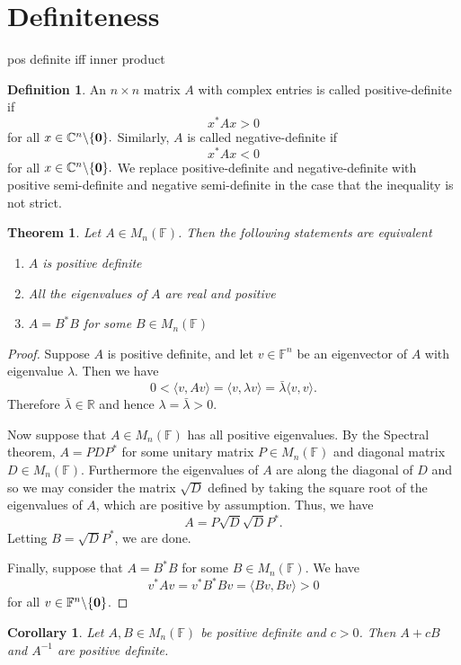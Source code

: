 \documentclass[oneside, 12pt]{book}
\newtheorem{thm}{Theorem}[section]
\newtheorem{cor}{Corollary}[section]
\theoremstyle{definition}
\newtheorem{defn}{Definition}[section]
\begin{document}
\section{Definiteness}
pos definite iff inner product
\begin{defn}
  \label{defn_posdef}
  An $n \times n$ matrix $A$ with complex entries is called positive-definite if \[x^{*}Ax>0\] for all $x \in \mathbb{C}^{n}\backslash\{\bold{0} \}.$
  Similarly, $A$ is called negative-definite if \[x^{*}Ax<0\] for all $x \in \mathbb{C}^{n}\backslash \{\bold{0}\}.$
  We replace positive-definite and negative-definite with positive semi-definite and negative semi-definite in the case that the inequality is not strict.
\end{defn}
\begin{thm}
  \label{thm_posdef}
  Let $A \in M_{n}(\mathbb{F})$. Then the following statements are equivalent
  \begin{enumerate}
    \item $A$ is positive definite
    \item All the eigenvalues of $A$ are real and positive
    \item $A=B^{*}B$ for some $B \in M_{n}(\mathbb{F})$
  \end{enumerate}
\end{thm}
\begin{proof}
  Suppose $A$ is positive definite, and let $v \in \mathbb{F}^{n}$ be an eigenvector of $A$ with eigenvalue $\lambda$. Then we have
  \[0<\langle v, Av \rangle = \langle v, \lambda v \rangle=\bar{\lambda} \langle v, v \rangle .\]
  Therefore $\bar{\lambda} \in \mathbb{R}$ and hence $\lambda=\bar{\lambda}>0$.

  Now suppose that $A \in M_{n}(\mathbb{F})$ has all positive eigenvalues. By the Spectral theorem, $A=PDP^{*}$ for some unitary matrix $P \in M_{n}(\mathbb{F})$ and diagonal matrix $D \in M_{n}(\mathbb{F})$. Furthermore the eigenvalues of $A$ are along the diagonal of $D$ and so we may consider the matrix $\sqrt{D}$ defined by taking the square root of the eigenvalues of $A$, which are positive by assumption. Thus, we have \[A=P\sqrt{D}\sqrt{D}P^{*}.\] Letting $B=\sqrt{D}P^{*}$, we are done.

  Finally, suppose that $A=B^{*}B$ for some $B \in M_{n}(\mathbb{F}).$
  We have \[v^{*}Av=v^{*}B^{*}Bv= \langle Bv, Bv \rangle > 0\] for all $v \in \mathbb{F}^{n} \backslash \{\bold{0}\}$.
\end{proof}
\begin{cor}
  \label{cor_posdefspace}
  Let $A,B \in M_{n}(\mathbb{F})$ be positive definite and $c>0$. Then $A+cB$ and $A^{-1}$ are positive definite.
\end{cor}
\end{document}
